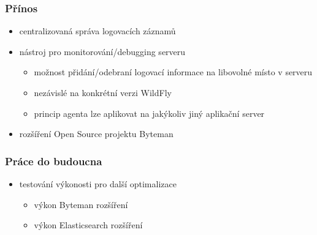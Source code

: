 \documentclass{beamer}
\begin{document}
\begin{frame}
	\frametitle{Přínos}
	\begin{itemize}
		\item centralizovaná správa logovacích záznamů
		\item nástroj pro monitorování/debugging serveru
		\begin{itemize}
			\item možnost přidání/odebraní logovací informace na libovolné místo v serveru
			\item nezávislé na konkrétní verzi WildFly
			\item princip agenta lze aplikovat na jakýkoliv jiný aplikační server
		\end{itemize}
		\item rozšíření Open Source projektu Byteman
	\end{itemize}
\end{frame}

\begin{frame}
	\frametitle{Práce do budoucna}
	\begin{itemize}
		\item testování výkonosti pro další optimalizace
		\begin{itemize}
			\item výkon Byteman rozšíření
			\item výkon Elasticsearch rozšíření
		\end{itemize}
	\end{itemize}
	
\end{frame}

\end{document}
